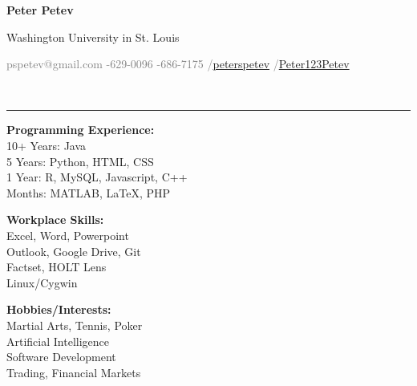 \documentclass[11pt]{article}
\begin{document}
	\begin{titlepage}
		\small
			\begin{center}
				\centerline{{\Large \textbf{Peter Petev}}}
				\centerline{Washington University in St. Louis}
				\small
				\begin{minipage}[b]{\textwidth}
					\textcolor{gray}{\faEnvelope \space pspetev@gmail.com}\hfill
					\textcolor{gray}{\faMobilePhone {}-629-0096}\hfill
					\textcolor{gray}{\faPhoneSquare {}-686-7175}\hfill
					\textcolor{gray}{\faLinkedinSquare \slash \href{http://www.linkedin.com/in/peterspetev}{peterspetev}}\hfill
					\textcolor{gray}{\faGithubSquare \slash \href{http://www.github.com/Peter123Petev}{Peter123Petev}}
				\end{minipage}
			\end{center}
		\vspace{-15pt}
		\noindent\makebox[\linewidth]{\rule{\paperwidth}{0.4pt}}\vspace{5pt}
		\\\rule{\textwidth}{0.4pt}
		\begin{addmargin}[1em]{0em}
			\vspace{-10pt}
			\begin{center}
				\begin{minipage}[b]{0.4\textwidth}
					\textbf{Programming Experience:}\\ 10+ Years: Java\\ 5 Years: Python, HTML, CSS\\ 1 Year: R, MySQL, Javascript, C++\\Months: MATLAB, \LaTeX, PHP\\
				\end{minipage}%
				\begin{minipage}[b]{0.3\textwidth}
					\textbf{Workplace Skills:}\\ Excel, Word, Powerpoint\\ Outlook, Google Drive, Git\\ Factset, HOLT Lens\\Linux/Cygwin\\
				\end{minipage}%
				\begin{minipage}[b]{0.3\textwidth}
					\textbf{Hobbies/Interests:}\\ Martial Arts, Tennis, Poker\\ Artificial Intelligence\\ Software Development\\ Trading, Financial Markets\\

\end{minipage}
\end{center}
\end{addmargin}
\end{titlepage}
\end{document}
